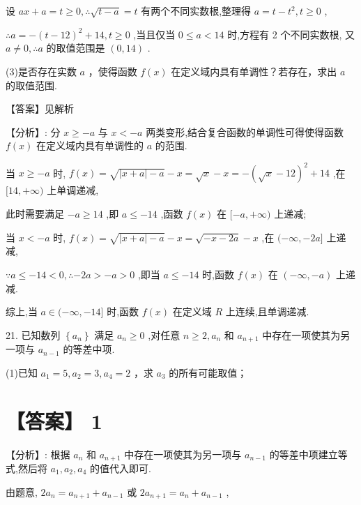 \documentclass[10pt]{article}
\begin{document}
设 \({ax} + a = t \geq  0,\therefore \sqrt{t - a} = t\) 有两个不同实数根,整理得 \(a = t - {t}^{2},t \geq  0\) ,

\(\therefore a =  - {\left( t - {12}\right) }^{2} + {14},t \geq  0\) ,当且仅当 \(0 \leq  a < {14}\) 时,方程有 2 个不同实数根, 又 \(a \neq  0,\therefore a\) 的取值范围是 \(\left( {0,{14}}\right)\) .

(3)是否存在实数 \(a\) ，使得函数 \(f\left( x\right)\) 在定义域内具有单调性？若存在，求出 \(a\) 的取值范围.

【答案】见解析

【分析】: 分 \(x \geq   - a\) 与 \(x <  - a\) 两类变形,结合复合函数的单调性可得使得函数 \(f\left( x\right)\) 在定义域内具有单调性的 \(a\) 的范围.

当 \(x \geq   - a\) 时, \(f\left( x\right)  = \sqrt{\left| {x + a}\right|  - a} - x = \sqrt{x} - x =  - {\left( \sqrt{x} - {12}\right) }^{2} + {14}\) ,在 \(\lbrack {14}, + \infty )\) 上单调递减,

此时需要满足 \(- a \geq  {14}\) ,即 \(a \leq   - {14}\) ,函数 \(f\left( x\right)\) 在 \(\lbrack  - a, + \infty )\) 上递减;

当 \(x <  - a\) 时, \(f\left( x\right)  = \sqrt{\left| {x + a}\right|  - a} - x = \sqrt{-x - {2a}} - x\) ,在 \(( - \infty , - {2a}\rbrack\) 上递减,

\(\because a \leq   - {14} < 0,\therefore  - {2a} >  - a > 0\) ,即当 \(a \leq   - {14}\) 时,函数 \(f\left( x\right)\) 在 \(\left( {-\infty , - a}\right)\) 上递减.

综上,当 \(a \in  ( - \infty , - {14}\rbrack\) 时,函数 \(f\left( x\right)\) 在定义域 \(R\) 上连续,且单调递减.

21. 已知数列 \(\left\{  {a}_{n}\right\}\) 满足 \({a}_{n} \geq  0\) ,对任意 \(n \geq  2,{a}_{n}\) 和 \({a}_{n + 1}\) 中存在一项使其为另一项与 \({a}_{n - 1}\) 的等差中项.

(1)已知 \({a}_{1} = 5,{a}_{2} = 3,{a}_{4} = 2\) ，求 \({a}_{3}\) 的所有可能取值；

\section*{【答案】 1}

【分析】: 根据 \({a}_{n}\) 和 \({a}_{n + 1}\) 中存在一项使其为另一项与 \({a}_{n - 1}\) 的等差中项建立等式,然后将 \({a}_{1},{a}_{2},{a}_{4}\) 的值代入即可.

由题意, \(2{a}_{n} = {a}_{n + 1} + {a}_{n - 1}\) 或 \(2{a}_{n + 1} = {a}_{n} + {a}_{n - 1}\) ,
\end{document}
